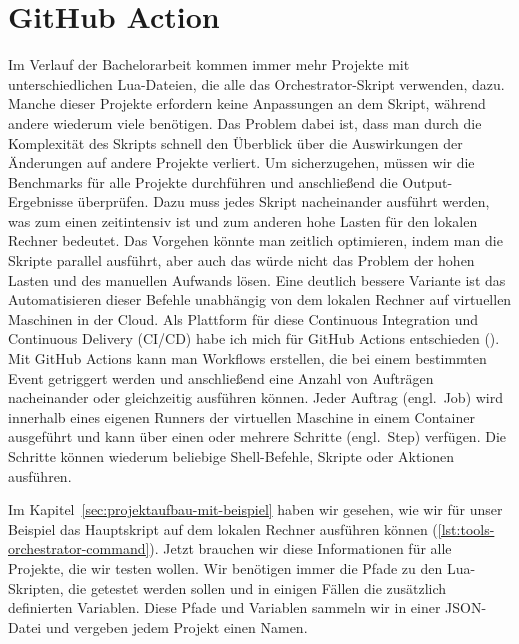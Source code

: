 \section{GitHub Action}\label{sec:github-action}

Im Verlauf der Bachelorarbeit kommen immer mehr Projekte mit unterschiedlichen Lua-Dateien, die alle das Orchestrator-Skript verwenden, dazu.
Manche dieser Projekte erfordern keine Anpassungen an dem Skript, während andere wiederum viele benötigen.
Das Problem dabei ist, dass man durch die Komplexität des Skripts schnell den Überblick über die Auswirkungen der Änderungen auf andere Projekte verliert.
Um sicherzugehen, müssen wir die Benchmarks für alle Projekte durchführen und anschließend die Output-Ergebnisse überprüfen.
Dazu muss jedes Skript nacheinander ausführt werden, was zum einen zeitintensiv ist und zum anderen hohe Lasten für den lokalen Rechner bedeutet.
Das Vorgehen könnte man zeitlich optimieren, indem man die Skripte parallel ausführt, aber auch das würde nicht das Problem der hohen Lasten und des manuellen Aufwands lösen.
Eine deutlich bessere Variante ist das Automatisieren dieser Befehle unabhängig von dem lokalen Rechner auf virtuellen Maschinen in der Cloud.
Als Plattform für diese Continuous Integration und Continuous Delivery (CI/CD) habe ich mich für GitHub Actions entschieden (\cite{github_action_doku}).
Mit GitHub Actions kann man Workflows erstellen, die bei einem bestimmten Event getriggert werden und anschließend eine Anzahl von Aufträgen nacheinander oder gleichzeitig ausführen können.
Jeder Auftrag (engl.\ Job) wird innerhalb eines eigenen Runners der virtuellen Maschine in einem Container ausgeführt und kann über einen oder mehrere Schritte (engl.\ Step) verfügen.
Die Schritte können wiederum beliebige Shell-Befehle, Skripte oder Aktionen ausführen.

Im Kapitel~\ref{sec:projektaufbau-mit-beispiel} haben wir gesehen, wie wir für unser Beispiel das Hauptskript auf dem lokalen Rechner ausführen können (\ref{lst:tools-orchestrator-command}).
Jetzt brauchen wir diese Informationen für alle Projekte, die wir testen wollen.
Wir benötigen immer die Pfade zu den Lua-Skripten, die getestet werden sollen und in einigen Fällen die zusätzlich definierten Variablen.
Diese Pfade und Variablen sammeln wir in einer JSON-Datei und vergeben jedem Projekt einen Namen.

\vspace{-8pt}

\vspace{-5pt}

